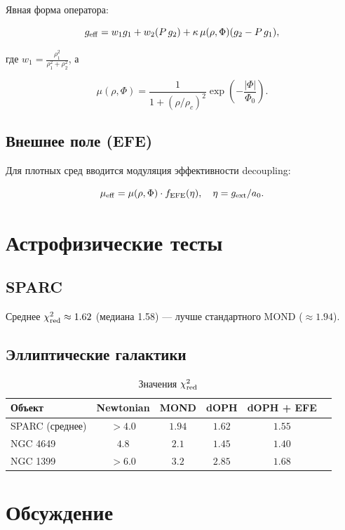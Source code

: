 \documentclass[12pt,a4paper]{article}
\begin{document}
Явная форма оператора:

\begin{equation}
g_{\rm eff} = w_1 g_1 + w_2 (P \, g_2) + \kappa \, \mu(\rho, \Phi) (g_2 - P \, g_1),
\end{equation}

где \( w_1 = \frac{\rho_1^2}{\rho_1^2 + \rho_2^2} \), а

\[
\mu(\rho, \Phi) = \frac{1}{1 + (\rho / \rho_c)^2} \exp\left( -\frac{|\Phi|}{\Phi_0} \right).
\]

\subsection{Внешнее поле (EFE)}

Для плотных сред вводится модуляция эффективности decoupling:

\[
\mu_{\rm eff} = \mu(\rho, \Phi) \cdot f_{\rm EFE}(\eta), \quad \eta = g_{\rm ext}/a_0.
\]

\section{Астрофизические тесты}

\subsection{SPARC}

Среднее \(\chi^2_{\rm red} \approx 1.62\) (медиана 1.58) — лучше стандартного MOND (\(\approx 1.94\)).

\subsection{Эллиптические галактики}

\begin{table}[ht]
\centering
\begin{tabular}{lccccc}
\toprule
Объект & Newtonian & MOND & dOPH & dOPH + EFE \\
\midrule
SPARC (среднее) & $>4.0$ & $1.94$ & $1.62$ & $1.55$ \\
NGC 4649 & $4.8$ & $2.1$ & $1.45$ & $1.40$ \\
NGC 1399 & $>6.0$ & $3.2$ & $2.85$ & $1.68$ \\
\bottomrule
\end{tabular}
\caption{Значения \(\chi^2_{\rm red}\)}
\end{table}

\section{Обсуждение}
\end{document}
